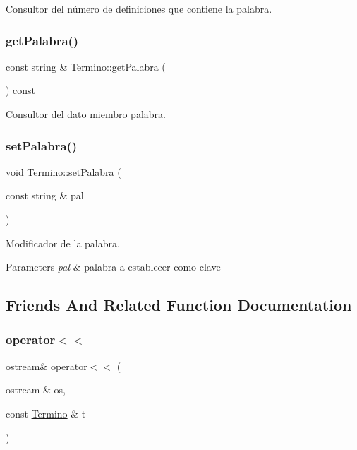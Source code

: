 Consultor del número de definiciones que contiene la palabra. 

\mbox{\label{class_termino_aaed2bb666fca9e956baeac5858aa7dd1}} 
\subsubsection{\texorpdfstring{get\+Palabra()}{getPalabra()}}
{\footnotesize\ttfamily const string \& Termino\+::get\+Palabra (\begin{DoxyParamCaption}{ }\end{DoxyParamCaption}) const}



Consultor del dato miembro palabra. 

\mbox{\label{class_termino_a00c9ea9d2348f75f595f2ecf46183c4c}} 
\subsubsection{\texorpdfstring{set\+Palabra()}{setPalabra()}}
{\footnotesize\ttfamily void Termino\+::set\+Palabra (\begin{DoxyParamCaption}\item[{const string \&}]{pal }\end{DoxyParamCaption})}



Modificador de la palabra. 


\begin{DoxyParams}{Parameters}
{\em pal} & palabra a establecer como clave \\
\hline
\end{DoxyParams}


\subsection{Friends And Related Function Documentation}
\mbox{\label{class_termino_a990203f35e5916790b154a3eb6baf829}} 
\subsubsection{\texorpdfstring{operator$<$$<$}{operator<<}}
{\footnotesize\ttfamily ostream\& operator$<$$<$ (\begin{DoxyParamCaption}\item[{ostream \&}]{os,  }\item[{const \mbox{\hyperlink{class_termino}{Termino}} \&}]{t }\end{DoxyParamCaption})\hspace{0.3cm}{\ttfamily [friend]}}



